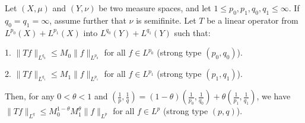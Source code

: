 \begin{theorem}
    
Let $(X, \mu)$ and $(Y, \nu)$ be two measure spaces, and let $1 \leqslant p_0, p_1, q_0, q_1 \leqslant \infty$. If $q_0 = q_1 = \infty$, assume further that $\nu$ is semifinite. Let $T$ be a linear operator from $L^{p_0}(X) + L^{p_1}(X)$ into $L^{q_0}(Y) + L^{q_1}(Y)$ such that:

1. $\|Tf\|_{L^{q_0}} \leqslant M_0\|f\|_{L^{p_0}}$ for all $f \in L^{p_0}$ (strong type $(p_0, q_0)$).

2. $\|Tf\|_{L^{q_1}} \leqslant M_1\|f\|_{L^{p_1}}$ for all $f \in L^{p_1}$ (strong type $(p_1, q_1)$).

Then, for any $0 < \theta < 1$ and $\left(\frac{1}{p}, \frac{1}{q}\right) = (1-\theta)\left(\frac{1}{p_0}, \frac{1}{q_0}\right) + \theta\left(\frac{1}{p_1}, \frac{1}{q_1}\right)$, we have $\|Tf\|_{L^q} \leqslant M_0^{1-\theta}M_1^\theta\|f\|_{L^p}$ for all $f \in L^p$ (strong type $(p, q)$).
\end{theorem}
